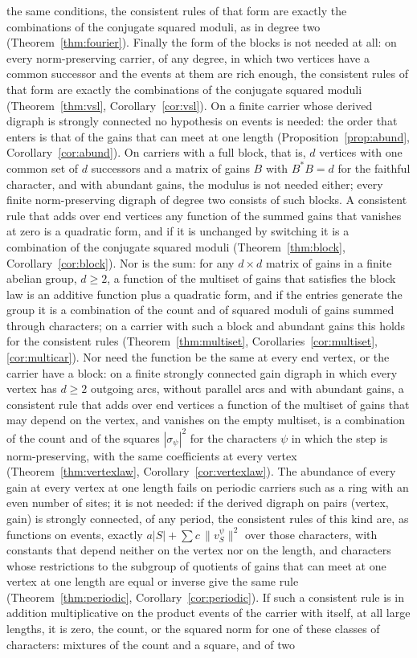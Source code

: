 \begin{enumerate}[label=(\roman*)]
the same conditions, the consistent rules of that form are exactly the combinations of the conjugate squared moduli, as in degree two (Theorem~\ref{thm:fourier}). Finally the form of the blocks is not needed at all: on every norm-preserving carrier, of any degree, in which two vertices have a common successor and the events at them are rich enough, the consistent rules of that form are exactly the combinations of the conjugate squared moduli (Theorem~\ref{thm:vsl}, Corollary~\ref{cor:vsl}). On a finite carrier whose derived digraph is strongly connected no hypothesis on events is needed: the order that enters is that of the gains that can meet at one length (Proposition~\ref{prop:abund}, Corollary~\ref{cor:abund}). On carriers with a full block, that is, $d$ vertices with one common set of $d$ successors and a matrix of gains $B$ with $B^*B=d$ for the faithful character, and with abundant gains, the modulus is not needed either; every finite norm-preserving digraph of degree two consists of such blocks. A consistent rule that adds over end vertices any function of the summed gains that vanishes at zero is a quadratic form, and if it is unchanged by switching it is a combination of the conjugate squared moduli (Theorem~\ref{thm:block}, Corollary~\ref{cor:block}). Nor is the sum: for any $d\times d$ matrix of gains in a finite abelian group, $d\ge2$, a function of the multiset of gains that satisfies the block law is an additive function plus a quadratic form, and if the entries generate the group it is a combination of the count and of squared moduli of gains summed through characters; on a carrier with such a block and abundant gains this holds for the consistent rules (Theorem~\ref{thm:multiset}, Corollaries~\ref{cor:multiset}, \ref{cor:multicar}). Nor need the function be the same at every end vertex, or the carrier have a block: on a finite strongly connected gain digraph in which every vertex has $d\ge2$ outgoing arcs, without parallel arcs and with abundant gains, a consistent rule that adds over end vertices a function of the multiset of gains that may depend on the vertex, and vanishes on the empty multiset, is a combination of the count and of the squares $|\sigma_\psi|^2$ for the characters $\psi$ in which the step is norm-preserving, with the same coefficients at every vertex (Theorem~\ref{thm:vertexlaw}, Corollary~\ref{cor:vertexlaw}). The abundance of every gain at every vertex at one length fails on periodic carriers such as a ring with an even number of sites; it is not needed: if the derived digraph on pairs (vertex, gain) is strongly connected, of any period, the consistent rules of this kind are, as functions on events, exactly $a|S|+\sum c\,\lVert v^\psi_S\rVert^2$ over those characters, with constants that depend neither on the vertex nor on the length, and characters whose restrictions to the subgroup of quotients of gains that can meet at one vertex at one length are equal or inverse give the same rule (Theorem~\ref{thm:periodic}, Corollary~\ref{cor:periodic}). If such a consistent rule is in addition multiplicative on the product events of the carrier with itself, at all large lengths, it is zero, the count, or the squared norm for one of these classes of characters: mixtures of the count and a square, and of two 
\end{enumerate}
